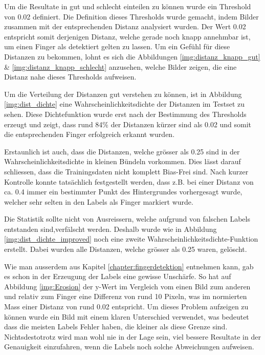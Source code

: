 Um die Resultate in gut und schlecht einteilen zu können wurde ein Threshold von 0.02 definiert.
Die Definition dieses Thresholds wurde gemacht, indem Bilder zusammen mit der entsprechenden Distanz analysiert wurden.
Der Wert 0.02 entspricht somit derjenigen Distanz, welche gerade noch knapp annehmbar ist, um einen Finger als detektiert gelten zu lassen.
Um ein Gefühl für diese Distanzen zu bekommen, lohnt es sich die Abbildungen \ref{img:distanz_knapp_gut} \& \ref{img:distanz_knapp_schlecht} anzusehen, welche Bilder zeigen, die eine Distanz nahe dieses Thresholds aufweisen. 

Um die Verteilung der Distanzen gut verstehen zu können, ist in Abbildung \ref{img:dist_dichte} eine Wahrscheinlichkeitsdichte der Distanzen im Testset zu sehen. Diese Dichtefunktion wurde erst nach der Bestimmung des Thresholds erzeugt und zeigt, dass rund 84\% der Distanzen kürzer sind als 0.02 und somit die entsprechenden Finger \grqq{}erfolgreich\grqq{} erkannt wurden.

Erstaunlich ist auch, dass die Distanzen, welche grösser als 0.25 sind in der Wahrscheinlichkeitsdichte in kleinen Bündeln vorkommen. 
Dies lässt darauf schliessen, dass die Trainingsdaten nicht komplett Bias-Frei sind.
Nach kurzer Kontrolle konnte tatsächlich festgestellt werden, dass z.B. bei einer Distanz von ca. 0.4 immer ein bestimmter Punkt des Hintergrundes vorhergesagt wurde, welcher sehr selten in den Labels als Finger markiert wurde. 

Die Statistik sollte nicht von Ausreissern, welche aufgrund von falschen Labels entstanden sind,verfälscht werden.
Deshalb wurde wie in Abbildung \ref{img:dist_dichte_improved} noch eine zweite Wahrscheinlichkeitsdichte-Funktion erstellt. 
Dabei wurden alle Distanzen, welche grösser als 0.25 waren, gelöscht.

Wie man ausserdem aus Kapitel \ref{chapter:fingerdetektion} entnehmen kann, gab es schon in der Erzeugung der Labels eine gewisse Unschärfe.
So hat auf Abbildung \ref{img:Erosion}  der y-Wert im Vergleich vom einen Bild zum anderen und relativ zum Finger eine Differenz von rund 10 Pixeln, was im normierten Mass einer Distanz von rund 0.02 entspricht.
Um dieses Problem aufzeigen zu können wurde ein Bild mit einem klaren Unterschied verwendet, was bedeutet dass die meisten Labels Fehler haben, die kleiner als diese Grenze sind.
Nichtsdestotrotz wird man wohl nie in der Lage sein, viel bessere Resultate in der Genauigkeit einzufahren, wenn die Labels noch solche Abweichungen aufweisen.

